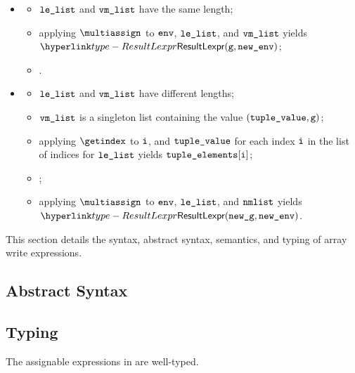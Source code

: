 \ProseParagraph
\OneApplies
\begin{itemize}
  \item {}
  \begin{itemize}
    \item $\texttt{le\_list}$ and $\texttt{vm\_list}$ have the same length;
    \item applying $\multiassign$ to $\texttt{env}$, $\texttt{le\_list}$, and $\texttt{vm\_list}$ yields\\
          $\ResultLexpr(\vg, \newenv)$\ProseOrAbnormal;
    \item \Proseeqdef{$\newg$}{$\vg$}.
  \end{itemize}

  \item {}
  \begin{itemize}
    \item $\texttt{le\_list}$ and $\texttt{vm\_list}$ have different lengths;
    \item $\texttt{vm\_list}$ is a singleton list containing the value $(\texttt{tuple\_value}, \texttt{g})$;
    \item applying $\getindex$ to $\texttt{i}$, and $\texttt{tuple\_value}$ for each index
          $\texttt{i}$ in the list of indices for $\texttt{le\_list}$ yields $\texttt{tuple\_elements}[\texttt{i}]$\ProseOrError;
    \item {};
    \item applying $\multiassign$ to $\texttt{env}$, $\texttt{le\_list}$, and $\texttt{nmlist}$ yields\\
          $\ResultLexpr(\newg, \newenv)$\ProseOrAbnormal.
  \end{itemize}
\end{itemize}

\FormallyParagraph
{}

\hypertarget{def-setarraylexprterm}{}
This section details the syntax, abstract syntax, semantics, and typing of array write expressions.

\subsection{Abstract Syntax}

\subsection{Typing}
The assignable expressions in  are well-typed.

